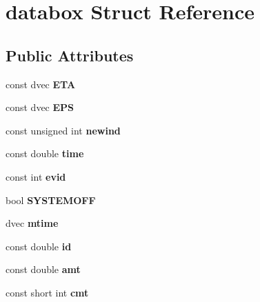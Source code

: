 \hypertarget{structdatabox}{}\section{databox Struct Reference}
\label{structdatabox}
\subsection*{Public Attributes}
\begin{DoxyCompactItemize}
\item 
\mbox{\label{structdatabox_a5fac1193968b572744c4d4aa8148a070}} 
const dvec {\bfseries E\+TA}
\item 
\mbox{\label{structdatabox_aa0ea406eebf198562a60fd3b3527da85}} 
const dvec {\bfseries E\+PS}
\item 
\mbox{\label{structdatabox_a806c83c3dac81b80887899c90c11cb4c}} 
const unsigned int {\bfseries newind}
\item 
\mbox{\label{structdatabox_ad06b00c78763c10af881f457dc2daffe}} 
const double {\bfseries time}
\item 
\mbox{\label{structdatabox_a160c192816f63a1474d6cd90eefb5755}} 
const int {\bfseries evid}
\item 
\mbox{\label{structdatabox_ae4c8b09dab65824965df8fcbfd38ae6c}} 
bool {\bfseries S\+Y\+S\+T\+E\+M\+O\+FF}
\item 
\mbox{\label{structdatabox_afcc24e6bcd9b78c787971887c8202a4f}} 
dvec {\bfseries mtime}
\item 
\mbox{\label{structdatabox_ad610389e4e5a17e9a81b544225c2d04a}} 
const double {\bfseries id}
\item 
\mbox{\label{structdatabox_aa1cf9f633d1c89b15c46f024d8980117}} 
const double {\bfseries amt}
\item 
\mbox{\label{structdatabox_a095ba8cd680dddc8715a25f54ca050c3}} 
const short int {\bfseries cmt}
\item 

\end{DoxyCompactItemize}
